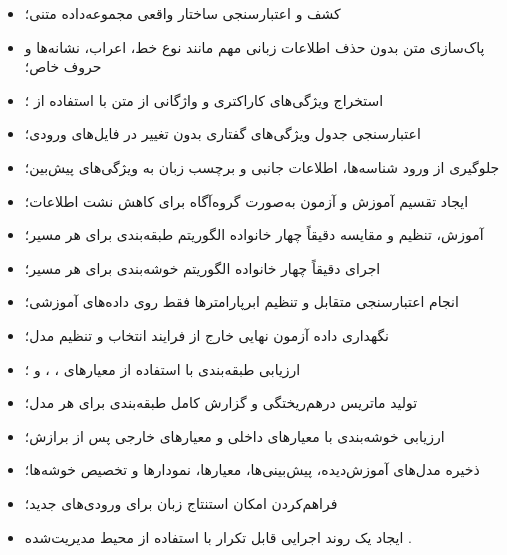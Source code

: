 \documentclass[12pt,a4paper,oneside]{report}
\begin{document}
\begin{itemize}

	\item کشف و اعتبارسنجی ساختار واقعی مجموعه‌داده متنی؛

	\item پاک‌سازی متن بدون حذف اطلاعات زبانی مهم مانند نوع خط، اعراب، نشانه‌ها و حروف خاص؛

	\item استخراج ویژگی‌های کاراکتری و واژگانی از متن با استفاده از
	؛

	\item اعتبارسنجی جدول ویژگی‌های گفتاری بدون تغییر در فایل‌های ورودی؛

	\item جلوگیری از ورود شناسه‌ها، اطلاعات جانبی و برچسب زبان به ویژگی‌های پیش‌بین؛

	\item ایجاد تقسیم آموزش و آزمون به‌صورت گروه‌آگاه برای کاهش نشت اطلاعات؛

	\item آموزش، تنظیم و مقایسه دقیقاً چهار خانواده الگوریتم طبقه‌بندی برای هر مسیر؛

	\item اجرای دقیقاً چهار خانواده الگوریتم خوشه‌بندی برای هر مسیر؛

	\item انجام اعتبارسنجی متقابل و تنظیم ابرپارامترها فقط روی داده‌های آموزشی؛

	\item نگهداری داده آزمون نهایی خارج از فرایند انتخاب و تنظیم مدل؛

	\item ارزیابی طبقه‌بندی با استفاده از معیارهای
	،
	،
	و
	؛

	\item تولید ماتریس درهم‌ریختگی و گزارش کامل طبقه‌بندی برای هر مدل؛

	\item ارزیابی خوشه‌بندی با معیارهای داخلی و معیارهای خارجی پس از برازش؛

	\item ذخیره مدل‌های آموزش‌دیده، پیش‌بینی‌ها، معیارها، نمودارها و تخصیص خوشه‌ها؛

	\item فراهم‌کردن امکان استنتاج زبان برای ورودی‌های جدید؛

	\item ایجاد یک روند اجرایی قابل تکرار با استفاده از محیط مدیریت‌شده
	.

\end{itemize}
\end{document}
